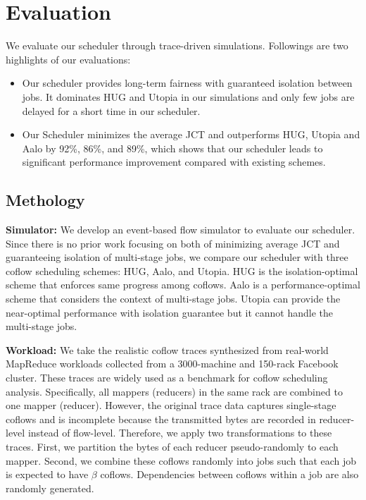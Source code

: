 \documentclass[10pt, conference, letterpaper]{IEEEtran}
\begin{document}
\section{Evaluation}
We evaluate our scheduler through trace-driven simulations. Followings are two highlights of our evaluations:%

\begin{itemize}
	\item Our scheduler provides long-term fairness with guaranteed isolation between jobs. It dominates HUG\cite{HUG} and Utopia\cite{utopia} in our simulations and only few jobs are delayed for a short time in our scheduler.
	\item Our Scheduler minimizes the average JCT and outperforms HUG, Utopia and Aalo by 92\%, 86\%, and 89\%, which shows that our scheduler leads to significant performance improvement compared with existing schemes.
\end{itemize}

\subsection{Methology}\label{evaluation}
\noindent\textbf{Simulator:} We develop an event-based flow simulator to evaluate our scheduler. Since there is no prior work focusing on both of minimizing average JCT and guaranteeing isolation of multi-stage jobs, we compare our scheduler with three coflow scheduling schemes: HUG\cite{HUG}, Aalo\cite{aalo}, and Utopia\cite{utopia}. HUG is the isolation-optimal scheme that enforces same progress among coflows. Aalo is a performance-optimal scheme that considers the context of multi-stage jobs. Utopia can provide the near-optimal performance with isolation guarantee but it cannot handle the multi-stage jobs.

\noindent\textbf{Workload:} We take the realistic coflow traces\cite{benchmark} synthesized from real-world MapReduce workloads collected from a 3000-machine and 150-rack Facebook cluster. These traces are widely used as a benchmark for coflow scheduling analysis\cite{varys,aalo,minimizing,fair}. Specifically, all mappers (reducers) in the same rack are combined to one mapper (reducer). However, the original trace data captures single-stage coflows and is incomplete because the transmitted bytes are recorded in reducer-level instead of flow-level. Therefore, we apply two transformations to these traces. First, we partition the bytes of each reducer pseudo-randomly to each mapper. Second, we combine these coflows randomly into jobs such that each job is expected to have $\beta$ coflows. Dependencies between coflows within a job are also randomly generated.
\end{document}
